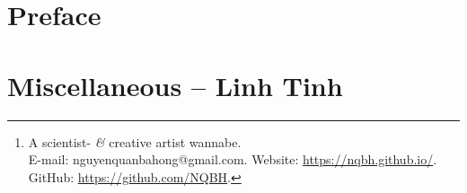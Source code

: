 \documentclass[12pt]{report}
\title{}
\author{Nguyễn Quản Bá Hồng\footnote{A scientist- {\it\&} creative artist wannabe.\\E-mail: {\sf nguyenquanbahong@gmail.com}. Website: \url{https://nqbh.github.io/}. GitHub: \url{https://github.com/NQBH}.}}
\date{\today}
\begin{document}
\maketitle
\begin{abstract}
	This text is a part of the series {\it Some Topics in Advanced STEM \& Beyond}:
	
	{\sc url}: \url{https://nqbh.github.io/advanced_STEM/}.
	
	Latest version:
	\begin{itemize}
		\item {\it }.
		
		PDF: {\sc url}: \url{}.
		
		\TeX: {\sc url}: \url{}.
	\end{itemize}
\end{abstract}
\tableofcontents


\chapter{Preface}
	

\chapter{Miscellaneous -- Linh Tinh}


\printbibliography[heading=bibintoc]
\end{document}
